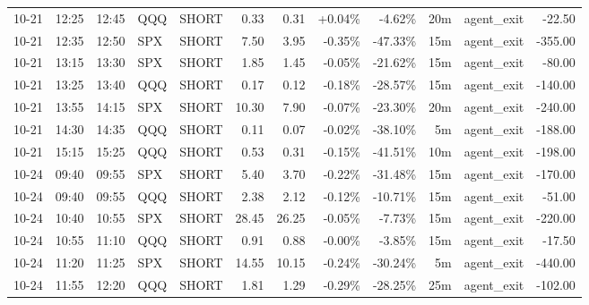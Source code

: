 \documentclass[11pt,a4paper]{article}
\begin{document}
\begin{center}
\begin{longtable}{>{\color{txtmain}}l l l l l r r r r r >{\color{txtmain}}l r}
10-21 & 12:25 & 12:45 & QQQ & SHORT & 0.33 & 0.31 & \textcolor{wingreen}{+0.04\%} & \textcolor{lossred}{-4.62\%} & 20m & agent\_exit & \textcolor{lossred}{-22.50} \\
10-21 & 12:35 & 12:50 & SPX & SHORT & 7.50 & 3.95 & \textcolor{lossred}{-0.35\%} & \textcolor{lossred}{-47.33\%} & 15m & agent\_exit & \textcolor{lossred}{-355.00} \\
10-21 & 13:15 & 13:30 & SPX & SHORT & 1.85 & 1.45 & \textcolor{lossred}{-0.05\%} & \textcolor{lossred}{-21.62\%} & 15m & agent\_exit & \textcolor{lossred}{-80.00} \\
10-21 & 13:25 & 13:40 & QQQ & SHORT & 0.17 & 0.12 & \textcolor{lossred}{-0.18\%} & \textcolor{lossred}{-28.57\%} & 15m & agent\_exit & \textcolor{lossred}{-140.00} \\
10-21 & 13:55 & 14:15 & SPX & SHORT & 10.30 & 7.90 & \textcolor{lossred}{-0.07\%} & \textcolor{lossred}{-23.30\%} & 20m & agent\_exit & \textcolor{lossred}{-240.00} \\
10-21 & 14:30 & 14:35 & QQQ & SHORT & 0.11 & 0.07 & \textcolor{lossred}{-0.02\%} & \textcolor{lossred}{-38.10\%} & 5m & agent\_exit & \textcolor{lossred}{-188.00} \\
10-21 & 15:15 & 15:25 & QQQ & SHORT & 0.53 & 0.31 & \textcolor{lossred}{-0.15\%} & \textcolor{lossred}{-41.51\%} & 10m & agent\_exit & \textcolor{lossred}{-198.00} \\
10-24 & 09:40 & 09:55 & SPX & SHORT & 5.40 & 3.70 & \textcolor{lossred}{-0.22\%} & \textcolor{lossred}{-31.48\%} & 15m & agent\_exit & \textcolor{lossred}{-170.00} \\
10-24 & 09:40 & 09:55 & QQQ & SHORT & 2.38 & 2.12 & \textcolor{lossred}{-0.12\%} & \textcolor{lossred}{-10.71\%} & 15m & agent\_exit & \textcolor{lossred}{-51.00} \\
10-24 & 10:40 & 10:55 & SPX & SHORT & 28.45 & 26.25 & \textcolor{lossred}{-0.05\%} & \textcolor{lossred}{-7.73\%} & 15m & agent\_exit & \textcolor{lossred}{-220.00} \\
10-24 & 10:55 & 11:10 & QQQ & SHORT & 0.91 & 0.88 & \textcolor{lossred}{-0.00\%} & \textcolor{lossred}{-3.85\%} & 15m & agent\_exit & \textcolor{lossred}{-17.50} \\
10-24 & 11:20 & 11:25 & SPX & SHORT & 14.55 & 10.15 & \textcolor{lossred}{-0.24\%} & \textcolor{lossred}{-30.24\%} & 5m & agent\_exit & \textcolor{lossred}{-440.00} \\
10-24 & 11:55 & 12:20 & QQQ & SHORT & 1.81 & 1.29 & \textcolor{lossred}{-0.29\%} & \textcolor{lossred}{-28.25\%} & 25m & agent\_exit & \textcolor{lossred}{-102.00} \\

\end{longtable}
\end{center}
\end{document}
